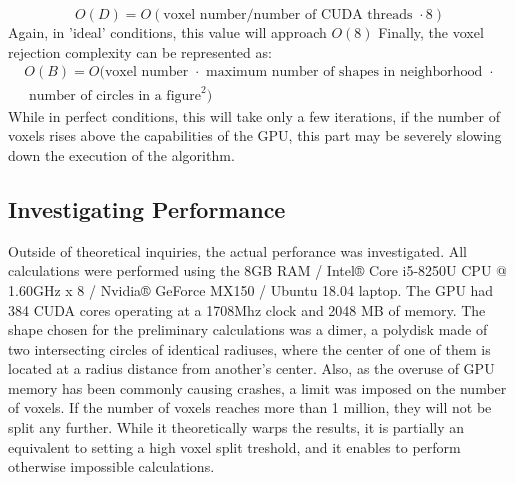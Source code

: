 \documentclass[12pt, oneside]{report}
\begin{document}
\begin{equation*}
	O(D) = O(\text{voxel number}/ \text{number of CUDA threads } \cdot 8)
\end{equation*}
Again, in 'ideal' conditions, this value will approach $O(8)$ \newline
Finally, the voxel rejection complexity can be represented as:
\begin{gather*}
	O(B) = O(\text{voxel number } \cdot  \text{ maximum number of shapes in neighborhood } \cdot \\ \text{ number of circles in a figure}^2)
\end{gather*}
While in perfect conditions, this will take only a few iterations, if the number of voxels rises above the capabilities of the GPU, this part may be severely slowing down the execution of the algorithm.

\subsection{Investigating Performance}

Outside of theoretical inquiries, the actual perforance was investigated. All calculations were performed using the 8GB RAM / Intel® Core i5-8250U CPU @ 1.60GHz x 8 / Nvidia® GeForce MX150 / Ubuntu 18.04 laptop. The GPU had 384 CUDA cores operating at a 1708Mhz clock and 2048 MB of memory. \newline
The shape chosen for the preliminary calculations was a dimer, a polydisk made of two intersecting circles of identical radiuses, where the center of one of them is located at a radius distance from another's center. Also, as the overuse of GPU memory has been commonly causing crashes, a limit was imposed on the number of voxels. If the number of voxels reaches more than 1 million, they will not be split any further. While it theoretically warps the results, it is partially an equivalent to setting a high voxel split treshold, and it enables to perform otherwise impossible calculations.
\end{document}
